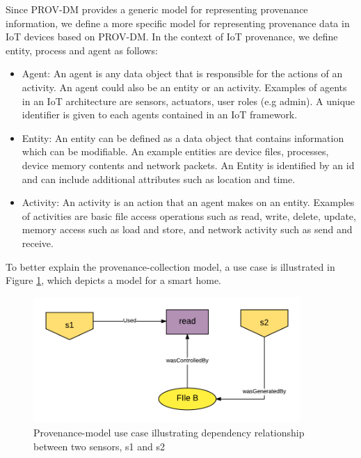  Since PROV-DM provides a generic model for representing provenance information, we define a more specific model for representing provenance data in IoT devices based on  PROV-DM. In the context of IoT provenance, we define entity, process and agent as follows:

\begin{itemize}

\item Agent: An agent is any data object that is responsible for the actions of an activity. An agent could also be an entity or an activity. Examples of agents in an IoT architecture are sensors, actuators, user roles (e.g admin). A unique identifier is given to each agents contained in an IoT framework.

\item Entity:  An entity can be defined as a data object that contains information which can be modifiable. An example entities are device files, processes, device memory contents and network packets. An Entity is identified by an id and can include additional attributes such as location and time.

\item Activity: An activity is an action that an agent makes on an entity. Examples of activities are basic file access operations such as read, write, delete, update, memory access such as load and store, and network activity such as send and receive. 


\end{itemize}


To better explain the provenance-collection model, a use case is illustrated in Figure \ref{prov_model}, which depicts a model for a smart home.



\begin{figure}[h]
\begin{center}

\includegraphics[width=4.0in]{prov_model_usecase.png}    
\end{center}
\caption{Provenance-model use case illustrating dependency relationship between two sensors, s1 and s2 }
\label{prov_model}
\end{figure}



